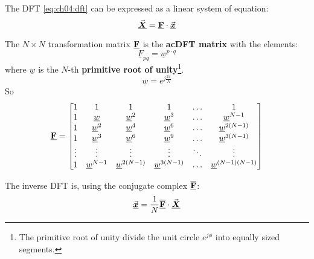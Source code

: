 \begin{refsection}
The \ac{DFT} \eqref{eq:ch04:dft} can be expressed as a linear system of equation:
\begin{equation}
	\vec{\bm{\underline{X}}} = \underline{\bm{\mathrm{F}}} \cdot \vec{\bm{\underline{x}}}
\end{equation}

The $N \times N$ transformation matrix $\underline{\bm{\mathrm{F}}}$ is the  \textbf{ac{DFT} matrix} with the elements:
\begin{equation}
	\underline{F}_{pq} = \underline{w}^{p \cdot q}
\end{equation}
where $\underline{w}$ is the $N$-th  \textbf{primitive root of unity}\footnote{The primitive root of unity divide the unit circle $e^{j \phi}$ into equally sized segments.}.
\begin{equation}
	\underline{w} = e^{j \frac{2 \pi}{N}}
\end{equation}
So
\begin{equation}
	\underline{\bm{\mathrm{F}}} = \left[
	\begin{matrix}
		1 & 1 & 1 & 1 & \ldots & 1 \\
		1 & \underline{w} & \underline{w}^2 & \underline{w}^3 & \ldots & \underline{w}^{N-1} \\
		1 & \underline{w}^2 & \underline{w}^4 & \underline{w}^6 & \ldots & \underline{w}^{2\left(N-1\right)} \\
		1 & \underline{w}^3 & \underline{w}^6 & \underline{w}^9 & \ldots & \underline{w}^{3\left(N-1\right)} \\
		\vdots & \vdots & \vdots & \vdots & \ddots & \vdots \\
		1 & \underline{w}^{N-1} & \underline{w}^{2\left(N-1\right)} & \underline{w}^{3\left(N-1\right)} & \ldots & \underline{w}^{\left(N-1\right)\left(N-1\right)} \\
	\end{matrix}
	\right]
\end{equation}

The inverse \ac{DFT} is, using the conjugate complex $\overline{\underline{\bm{\mathrm{F}}}}$:
\begin{equation}
	\vec{\bm{\underline{x}}} = \frac{1}{N} \overline{\underline{\bm{\mathrm{F}}}} \cdot \vec{\bm{\underline{X}}}
\end{equation}


\end{refsection}
